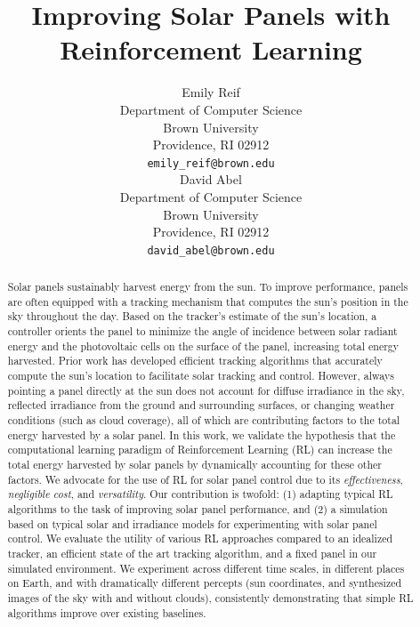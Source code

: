 \documentclass{article}
\title{Improving Solar Panels with Reinforcement Learning}
\author{
Emily Reif \\
Department of Computer Science\\
Brown University\\
Providence, RI 02912 \\
\texttt{emily\_reif@brown.edu} \\
\And
David Abel \\
Department of Computer Science\\
Brown University \\
Providence, RI 02912 \\
\texttt{david\_abel@brown.edu} \\
}
\begin{document}
\maketitle

\begin{abstract}
Solar panels sustainably harvest energy from the sun. To improve performance, panels are often equipped with a tracking mechanism that computes the sun's position in the sky throughout the day. Based on the tracker's estimate of the sun's location, a controller orients the panel to minimize the angle of incidence between solar radiant energy and the photovoltaic cells on the surface of the panel, increasing total energy harvested. Prior work has developed efficient tracking algorithms that accurately compute the sun's location to facilitate solar tracking and control.
%
However, always pointing a panel directly at the sun does not account for diffuse irradiance in the sky, reflected irradiance from the ground and surrounding surfaces, or changing weather conditions (such as cloud coverage), all of which are contributing factors to the total energy harvested by a solar panel.
%
In this work, we validate the hypothesis that the computational learning paradigm of Reinforcement Learning (RL) can increase the total energy harvested by solar panels by dynamically accounting for these other factors. We advocate for the use of RL for solar panel control due to its {\it effectiveness}, {\it negligible cost}, and {\it versatility}. Our contribution is twofold: (1) adapting typical RL algorithms to the task of improving solar panel performance, and (2) a simulation based on typical solar and irradiance models for experimenting with solar panel control.
%
We evaluate the utility of various RL approaches compared to an idealized tracker, an efficient state of the art tracking algorithm, and a fixed panel in our simulated environment. We experiment across different time scales, in different places on Earth, and with dramatically different percepts (sun coordinates, and synthesized images of the sky with and without clouds), consistently demonstrating that simple RL algorithms improve over existing baselines.
\end{abstract}


\end{document}
